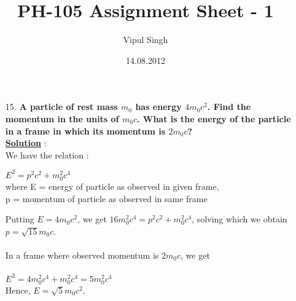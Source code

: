 \documentclass[10pt, a4paper]{article}
\begin{document}
\title{PH-105 Assignment Sheet - 1}
\date{14.08.2012}
\author{Vipul Singh}
\maketitle
\begin{enumerate}
\item[15.]{\bf A particle of rest mass $m_{0}$ has energy $4m_{0}c^{2}$. Find the momentum in the units of $m_{0}c$. What is the energy of the particle in a frame in which its momentum is $2m_{0}c$?}\\

{\underline {\bf Solution}} : \\
We have the relation :
\begin{center}
$E^{2}=p^{2}c^{2}+m_{0}^{2}c^{4}$\\
where E = energy of particle as observed in given frame, \\
p = momentum of particle as observed in same frame\\
\end{center}
Putting $E=4m_{0}c^{2}$, we get $16m_{0}^{2}c^{4}=p^{2}c^{2}+m_{0}^{2}c^{4}$, solving which we obtain $p=\sqrt{15}m_{0}c$. \\
\\
In a frame where observed momentum is $2m_{0}c$, we get \\
\\
$E^{2}=4m_{0}^{2}c^{4}+m_{0}^{2}c^{4}=5m_{0}^{2}c^{4}$\\
Hence, $E=\sqrt{5}m_{0}c^{2}$.
\end{enumerate}
\end{document}
